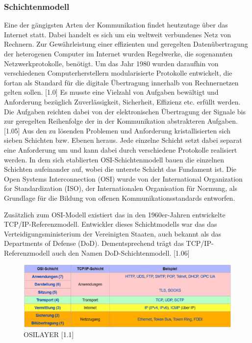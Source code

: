 \subsubsection{Schichtenmodell}

Eine der gängigsten Arten der Kommunikation findet heutzutage über das Internet statt. Dabei handelt es sich um ein weltweit verbundenes Netz von Rechnern. Zur Gewährleistung einer effizienten und geregelten Datenübertragung der heterogenen Computer im Internet wurden Regelwerke, die sogenannten Netzwerkprotokolle, benötigt. Um das Jahr 1980 wurden daraufhin von verschiedenen Computerherstellern modularisierte Protokolle entwickelt, die fortan als Standard für die digitale Übertragung innerhalb von Rechnernetzen gelten sollen. [1.0] Es musste eine Vielzahl von Aufgaben bewältigt und Anforderung bezüglich Zuverlässigkeit, Sicherheit, Effizienz etc. erfüllt werden. Die Aufgaben reichten dabei von der elektronischen Übertragung der Signale bis zur geregelten Reihenfolge der in der Kommunikation abstrakteren Aufgaben.  [1.05] Aus den zu lösenden Problemen und Anforderung kristallisierten sich sieben Schichten bzw. Ebenen heraus. Jede einzelne Schicht setzt dabei separat eine Anforderung um und kann dabei durch verschiedene Protokolle realisiert werden. In dem sich etablierten OSI-Schichtenmodell bauen die einzelnen Schichten aufeinander auf, wobei die unterste Schicht das Fundament ist. Die Open Systems Interconnection (OSI) wurde von der International Organization for Standardization (ISO), der Internationalen Organisation für Normung, als Grundlage für die Bildung von offenen Kommunikationsstandards entworfen. 
\newline

Zusätzlich zum OSI-Modell existiert das in den 1960er-Jahren entwickelte TCP/IP-Referenzmodell. Entwickler dieses Schichtmodells war das das Verteidigungsministerium der Vereinigten Staaten, auch bekannt als das Departments of Defense (DoD). Dementsprechend trägt das TCP/IP-Referenzmodell auch den Namen DoD-Schichtenmodell. [1.06]

\begin{figure}[h]
\centering
\includegraphics{images/Netzwerkprotokolle_OSI-Schicht.PNG}
\caption{OSILAYER [1.1]}
\end{figure}

